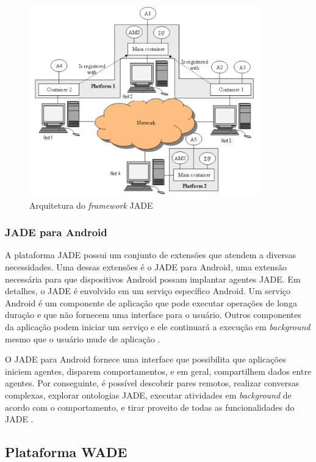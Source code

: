 \begin{figure}[h]
  \centering
  \includegraphics[width=10cm]{figuras/jade_architecture.png}
  \caption{Arquitetura do \textit{framework} JADE \cite{jadeArchitechture}}
  \label{figura:jade}
\end{figure}

\subsubsection{JADE para Android}

A plataforma JADE possui um conjunto de extensões que atendem a diversas necessidades. Uma dessas extensões é o JADE para Android, uma extensão necessária para que dispositivos Android possam implantar agentes JADE. Em detalhes, o JADE é envolvido em um serviço específico Android. Um serviço Android é um componente de aplicação que pode executar operações de longa duração e que não fornecem uma interface para o usuário. Outros componentes da aplicação podem iniciar um serviço e ele continuará a execução em \textit{background} mesmo que o usuário mude de aplicação \cite{bergenti2014}.

O JADE para Android fornece uma interface que possibilita que aplicações iniciem agentes, disparem comportamentos, e em geral, compartilhem dados entre agentes. Por conseguinte, é possível descobrir pares remotos, realizar conversas complexas, explorar ontologias JADE, executar atividades em \textit{background} de acordo com o comportamento, e tirar proveito de todas as funcionalidades do JADE \cite{bergenti2014}.

    \subsection{Plataforma WADE}

